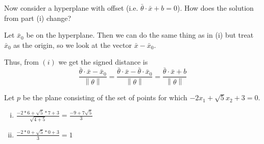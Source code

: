 \documentclass[12pt, letterpaper]{article}
\newenvironment{subsubproblem}[1]{%
  \begin{sspb}{#1}
    }{
  \end{sspb}
}
\begin{document}
\begin{subsubproblem}{}
    Now consider a hyperplane with offset (i.e. $\bar{\theta} \cdot \bar{x} + b = 0$). How does the solution from part
(i) change?
\end{subsubproblem}
\begin{solution}{}
    \setlength{\parindent}{0pt}
    Let $\bar{x}_0$ be on the hyperplane. Then we can do the same thing as in (i) but treat $\bar{x}_0$ as the origin, so we look at the vector $\bar{x}-\bar{x}_0$.

    Thus, from $(i)$ we get the signed distance is
    \[\frac{\bar{\theta} \cdot \bar{x}-\bar{x}_0}{\left\|\theta\right\|}=\frac{\bar{\theta} \cdot \bar{x} - \bar{\theta} \cdot \bar{x}_0}{\left\|\theta\right\|}=\frac{\bar{\theta} \cdot \bar{x} + b}{\left\|\theta\right\|}\]
\end{solution}
\begin{subsubproblem}{}
    Let $p$ be the plane consisting of the set of points for which $-2x_1 + \sqrt{5}x_2 + 3 = 0$.
\end{subsubproblem}
\begin{solution}{}
    \begin{enumerate}[i.]
        \item $\frac{-2 * 6 + \sqrt{5} * 7 + 3}{\sqrt{4+5}}=\frac{-9+7\sqrt{5}}{3}$
        \item $\frac{-2 * 0 + \sqrt{5} * 0 + 3}{3}=1$
    \end{enumerate}
\end{solution}
\end{document}
